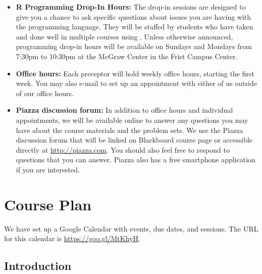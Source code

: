 \documentclass[11pt]{article}
\begin{document}
\begin{itemize}
\item {\bf R Programming Drop-In Hours:} The drop-in sessions are
  designed to give you a chance to ask specific questions about issues
  you are having with the \R{} programming language. They will be
  staffed by students who have taken and done well in multiple courses
  using \R{}. Unless otherwise announced, \R{} programming drop-in
  hours will be available on Sundays and Mondays from 7:30pm to
  10:30pm at the McGraw Center in the Frist Campus Center.
 
\item {\bf Office hours:} Each preceptor will hold weekly office
  hours, starting the first week. You may also e-mail to set up an
  appointment with either of us outside of our office hours.

\item {\bf Piazza discussion forum:} In addition to office hours and
  individual appointments, we will be available online to answer any
  questions you may have about the course materials and the problem
  sets.  We use the \textsf{Piazza} discussion forum that will be
  linked on Blackboard course page or accessible directly at
  \url{http://piazza.com}.  You should also feel free to respond to
  questions that you can answer.  \textsf{Piazza} also has a free
  smartphone application if you are interested.

\end{itemize}

\section{Course Plan}

We have set up a Google Calendar with events, due dates, and sessions.
The URL for this calendar is \url{https://goo.gl/MtKhyH}.  

\subsection*{Introduction}
\end{document}
